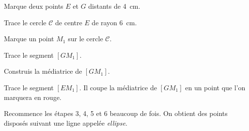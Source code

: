 \begin{myenumerate}
\item Marque deux points $E$ et $G$ distants de 4~cm.
\item Trace le cercle $\mathscr{C}$ de centre $E$ de rayon 6~cm.
\item Marque un point $M_1$ sur le cercle $\mathscr{C}$.
\item Trace le segment $[GM_1]$.
\item Construis la médiatrice de $[GM_1]$.
\item Trace le segment $[EM_1]$. Il coupe la médiatrice de $[GM_1]$ en
un point que l'on marquera en rouge.
\item Recommence les étapes 3, 4, 5 et 6 beaucoup de fois. On obtient
des points disposés suivant une ligne appelée {\em ellipse}.
\end{myenumerate}